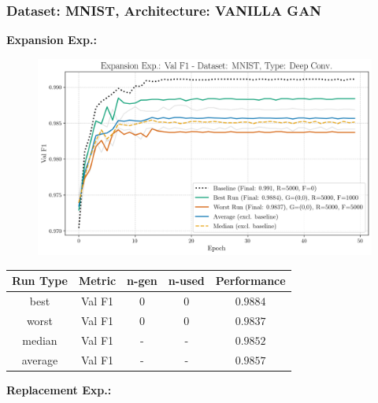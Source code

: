 \subsubsection{Dataset: MNIST, Architecture: VANILLA GAN}
\noindent\textbf{Expansion Exp.:}
\begin{figure}[htbp]
	\centering
	\includegraphics[width=.85\textwidth]{abb/strat_classifier_performance/MNIST_STRATIFIED_CLASSIFIERS_VANILLA_GAN/expansion_experiments/val_f1_score_['VANILLA']_MNIST_all.png}
	\label{fig:app_strat_class_performance_expansion_exp._val_f1_score_}
\end{figure}
\begin{table}[H]
	\centering
	\vspace{-1em}
	\begin{tabular}{|c|c|c|c|c|}
		\hline
		Run Type & Metric & n-gen & n-used & Performance \\ \hline
		best & Val F1 & 0 & 0 & $0.9884$\\ \hline
		worst & Val F1 & 0 & 0 & $0.9837$\\ \hline
		median & Val F1 & - & - & $0.9852$\\ \hline
		average & Val F1 & - & - & $0.9857$
		\\ \hline
	\end{tabular}
\end{table}
\noindent\textbf{Replacement Exp.:}
